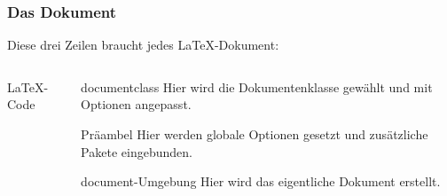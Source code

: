 \begin{frame}[fragile]
    \frametitle{Das Dokument}
    Diese drei Zeilen braucht jedes \LaTeX-Dokument:
    \begin{columns}[T]
        \begin{column}{0.47\textwidth}
            \begin{block}{\LaTeX-Code}
            \end{block}
        \end{column}
        \begin{column}{0.47\textwidth}
            \begin{block}{documentclass}
                Hier wird die Dokumentenklasse gewählt und mit Optionen angepasst. \\
            \end{block}
            \begin{block}{Präambel}
                Hier werden globale Optionen gesetzt und zusätzliche Pakete eingebunden.\\
            \end{block}
            \begin{block}{document-Umgebung}
                Hier wird das eigentliche Dokument erstellt.
            \end{block}
        \end{column}
    \end{columns}
\end{frame}

